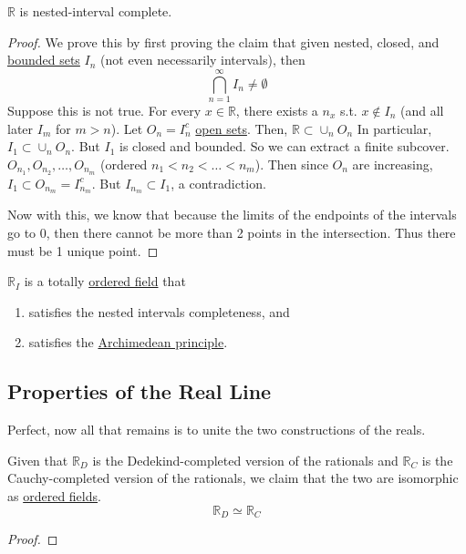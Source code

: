  \begin{theorem}
    \label{thm:cantors-intersection-theorem}
    $\mathbb{R}$ is nested-interval complete. 
  \end{theorem}
  \begin{proof}
    We prove this by first proving the claim that given nested, closed, and \hyperref[pst-def:bounded-set]{bounded sets} $I_n$ (not even necessarily intervals), then 
    \begin{equation}
      \bigcap_{n=1}^\infty I_n \neq \emptyset
    \end{equation}
    Suppose this is not true. For every $x \in \mathbb{R}$, there exists a $n_x$ s.t. $x \not\in I_n$ (and all later $I_m$ for $m > n$). Let $O_n = I_n^c$ \hyperref[pst-def:open-set]{open sets}. Then, $\mathbb{R} \subset \cup_n O_n$ In particular, $I_1 \subset \cup_n O_n$. But $I_1$ is closed and bounded. So we can extract a finite subcover. $O_{n_1}, O_{n_2}, \ldots, O_{n_m}$ (ordered $n_1 < n_2 < \ldots< n_m$). Then since $O_n$ are increasing, $I_1 \subset O_{n_m} = I_{n_m}^c$. But $I_{n_m} \subset I_1$, a contradiction. 

    Now with this, we know that because the limits of the endpoints of the intervals go to $0$, then there cannot be more than 2 points in the intersection. Thus there must be 1 unique point. 
  \end{proof} 

  \begin{definition}
    \label{def:axiomatic-construction-of-reals-with-nested}
    $\mathbb{R}_I$ is a totally \hyperref[alg-def:ordered-field]{ordered field} that 
    \begin{enumerate}
      \item satisfies the nested intervals completeness, and 
      \item satisfies the \hyperref[def:archimedean-principle]{Archimedean principle}.
    \end{enumerate}
  \end{definition}

\subsection{Properties of the Real Line}  

  Perfect, now all that remains is to unite the two constructions of the reals. 

  \begin{theorem}
    \label{thm:dedekind-and-cauchy-complete-reals-are}
    Given that $\mathbb{R}_D$ is the Dedekind-completed version of the rationals and $\mathbb{R}_C$ is the Cauchy-completed version of the rationals, we claim that the two are isomorphic as \hyperref[alg-def:ordered-field]{ordered fields}. 
    \begin{equation}
      \mathbb{R}_D \simeq \mathbb{R}_C
    \end{equation}
  \end{theorem}
  \begin{proof}
    
  \end{proof}


